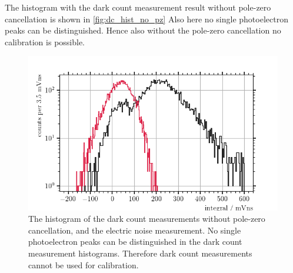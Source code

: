 The histogram with the dark count measurement result without pole-zero cancellation is shown in \autoref{fig:dc_hist_no_pz}
Also here no single photoelectron peaks can be distinguished.
Hence also without the pole-zero cancellation no calibration is possible.
\begin{figure}
	\centering
	\includegraphics[width=1.\textwidth]{pictures/dc_hist_no_pz}
	\caption[Histogram of the dark count measurements without pole-zero cancellation.]{The histogram of the dark count measurements without pole-zero cancellation, and the electric noise measurement. No single photoelectron peaks can be distinguished in the dark count measurement histograms. Therefore dark count measurements cannot be used for calibration.} 
	\label{fig:dc_hist_no_pz}
\end{figure}










